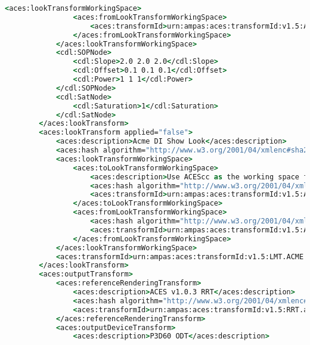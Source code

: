 \begin{lstlisting}[language=csh]
            <aces:lookTransformWorkingSpace>
                <aces:fromLookTransformWorkingSpace>
                    <aces:transformId>urn:ampas:aces:transformId:v1.5:ACEScsc.Academy.ACEScct_to_ACES.a1.0.3</aces:transformId>
                </aces:fromLookTransformWorkingSpace>
            </aces:lookTransformWorkingSpace>
            <cdl:SOPNode>
                <cdl:Slope>2.0 2.0 2.0</cdl:Slope>
                <cdl:Offset>0.1 0.1 0.1</cdl:Offset>
                <cdl:Power>1 1 1</cdl:Power>
            </cdl:SOPNode>
            <cdl:SatNode>
                <cdl:Saturation>1</cdl:Saturation>
            </cdl:SatNode>
        </aces:lookTransform>
        <aces:lookTransform applied="false">
            <aces:description>Acme DI Show Look</aces:description>
            <aces:hash algorithm="http://www.w3.org/2001/04/xmlenc#sha256">e3b0c44298fc1c149afbf4c8996fb92427ae41e4649b934ca495991b7852b855</aces:hash>
            <aces:lookTransformWorkingSpace>
                <aces:toLookTransformWorkingSpace>
                    <aces:description>Use ACEScc as the working space for this LMT</aces:description>
                    <aces:hash algorithm="http://www.w3.org/2001/04/xmlenc#sha256">07eb8b020fe8fc10c8c4b983cc37798324c7eee1319f07dd0028fca96f904a7f</aces:hash>
                    <aces:transformId>urn:ampas:aces:transformId:v1.5:ACEScsc.ACME.ACES_to_MyCustomLogSpace.a1.v1</aces:transformId>
                </aces:toLookTransformWorkingSpace>
                <aces:fromLookTransformWorkingSpace>
                    <aces:hash algorithm="http://www.w3.org/2001/04/xmlenc#sha256">ef461a45beded2c5204371f755ca2558e61743f288f3ccd719ce1de23ebcf9cb</aces:hash>
                    <aces:transformId>urn:ampas:aces:transformId:v1.5:ACEScsc.ACME.MyCustomLogSpace_to_ACES.a1.v1</aces:transformId>
                </aces:fromLookTransformWorkingSpace>
            </aces:lookTransformWorkingSpace>
            <aces:transformId>urn:ampas:aces:transformId:v1.5:LMT.ACME.AcmeDILook.a1.v5</aces:transformId>
        </aces:lookTransform>
        <aces:outputTransform>
            <aces:referenceRenderingTransform>
                <aces:description>ACES v1.0.3 RRT</aces:description>
                <aces:hash algorithm="http://www.w3.org/2001/04/xmlenc#sha256">c81af4fb4a22ee0353308e4582708951df4682bf73f838c24bf44e585fc3bb61</aces:hash>
                <aces:transformId>urn:ampas:aces:transformId:v1.5:RRT.a1.0.3</aces:transformId>
            </aces:referenceRenderingTransform>
            <aces:outputDeviceTransform>
                <aces:description>P3D60 ODT</aces:description>

\end{lstlisting}
